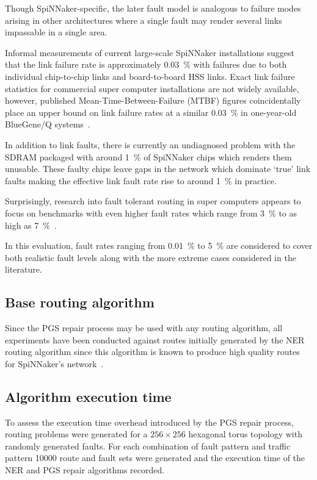 			Though SpiNNaker-specific, the later fault model is analogous to failure
			modes arising in other architectures where a single fault may render
			several links impassable in a single area.
			
			Informal measurements of current large-scale SpiNNaker installations
			suggest that the link failure rate is approximately \SI{0.03}{\percent}
			with failures due to both individual chip-to-chip links and
			board-to-board HSS links. Exact link failure statistics for commercial
			super computer installations are not widely available, however, published
			Mean-Time-Between-Failure (MTBF) figures coincidentally place an upper
			bound on link failure rates at a similar \SI{0.03}{\percent} in
			one-year-old BlueGene/Q systems~\cite{chiu11}.
			
			In addition to link faults, there is currently an undiagnosed problem
			with the SDRAM packaged with around \SI{1}{\percent} of SpiNNaker chips
			which renders them unusable. These faulty chips leave gaps in the network
			which dominate `true' link faults making the effective link fault rate
			rise to around \SI{1}{\percent} in practice.
			
			Surprisingly, research into fault tolerant routing in super computers
			appears to focus on benchmarks with even higher fault rates which range
			from \SI{3}{\percent} to as high as
			\SI{7}{\percent}~\cite{ho04,gomez04,mejia06}.
			
			In this evaluation, fault rates ranging from \SI{0.01}{\percent} to
			\SI{5}{\percent} are considered to cover both realistic fault levels
			along with the more extreme cases considered in the literature.
		
		\subsection{Base routing algorithm}
			
			Since the PGS repair process may be used with any routing algorithm, all
			experiments have been conducted against routes initially generated by the
			NER routing algorithm since this algorithm is known to produce high
			quality routes for SpiNNaker's network~\cite{navaridas14}.
			
		\subsection{Algorithm execution time}
			
			To assess the execution time overhead introduced by the PGS repair
			process, routing problems were generated for a $256\times256$ hexagonal
			torus topology with randomly generated faults. For each combination of
			fault pattern and traffic pattern \num{10000} route and fault sets were
			generated and the execution time of the NER and PGS repair algorithms
			recorded.
			
